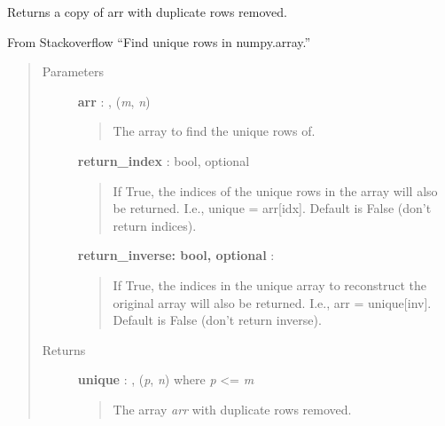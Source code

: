 \documentclass[letterpaper,10pt,english]{sphinxmanual}
\begin{document}
\begin{fulllineitems}
\label{gptools:gptools.utils.unique_rows}
Returns a copy of arr with duplicate rows removed.

From Stackoverflow ``Find unique rows in numpy.array.''
\begin{quote}\begin{description}
\item[{Parameters}] \leavevmode
\textbf{arr} : , (\emph{m}, \emph{n})
\begin{quote}

The array to find the unique rows of.
\end{quote}

\textbf{return\_index} : bool, optional
\begin{quote}

If True, the indices of the unique rows in the array will also be
returned. I.e., unique = arr{[}idx{]}. Default is False (don't return
indices).
\end{quote}

\textbf{return\_inverse: bool, optional} :
\begin{quote}

If True, the indices in the unique array to reconstruct the original
array will also be returned. I.e., arr = unique{[}inv{]}. Default is False
(don't return inverse).
\end{quote}

\item[{Returns}] \leavevmode
\textbf{unique} : , (\emph{p}, \emph{n}) where \emph{p} \textless{}= \emph{m}
\begin{quote}

The array \emph{arr} with duplicate rows removed.
\end{quote}

\end{description}\end{quote}

\end{fulllineitems}

\end{document}

